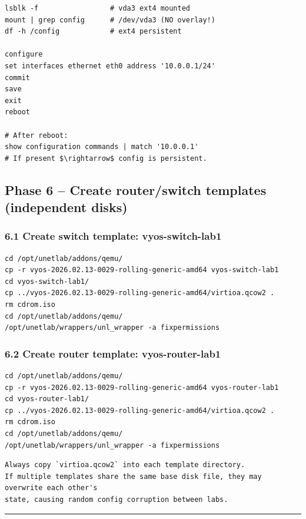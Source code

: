 \begin{lstlisting}
lsblk -f                 # vda3 ext4 mounted
mount | grep config      # /dev/vda3 (NO overlay!)
df -h /config            # ext4 persistent

configure
set interfaces ethernet eth0 address '10.0.0.1/24'
commit
save
exit
reboot

# After reboot:
show configuration commands | match '10.0.0.1'
# If present $\rightarrow$ config is persistent.
\end{lstlisting}

\subsection{Phase 6 -- Create router/switch templates (independent disks)}

\subsubsection{6.1 Create switch template: vyos-switch-lab1}

\begin{lstlisting}
cd /opt/unetlab/addons/qemu/
cp -r vyos-2026.02.13-0029-rolling-generic-amd64 vyos-switch-lab1
cd vyos-switch-lab1/
cp ../vyos-2026.02.13-0029-rolling-generic-amd64/virtioa.qcow2 .
rm cdrom.iso
cd /opt/unetlab/addons/qemu/
/opt/unetlab/wrappers/unl_wrapper -a fixpermissions
\end{lstlisting}

\subsubsection{6.2 Create router template: vyos-router-lab1}

\begin{lstlisting}
cd /opt/unetlab/addons/qemu/
cp -r vyos-2026.02.13-0029-rolling-generic-amd64 vyos-router-lab1
cd vyos-router-lab1/
cp ../vyos-2026.02.13-0029-rolling-generic-amd64/virtioa.qcow2 .
rm cdrom.iso
cd /opt/unetlab/addons/qemu/
/opt/unetlab/wrappers/unl_wrapper -a fixpermissions
\end{lstlisting}

\begin{lstlisting}
Always copy `virtioa.qcow2` into each template directory.
If multiple templates share the same base disk file, they may overwrite each other's
state, causing random config corruption between labs.
\end{lstlisting}

\begin{center}\rule{0.5\linewidth}{0.5pt}\end{center}

